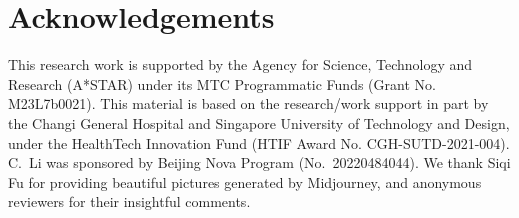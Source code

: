 \section*{Acknowledgements}

This research work is supported by the Agency for Science, Technology and Research (A*STAR) under its MTC Programmatic Funds (Grant No. M23L7b0021). 
This material is based on the research/work support in part by the Changi General Hospital and Singapore University of Technology and Design, under the HealthTech Innovation Fund (HTIF Award No. CGH-SUTD-2021-004). 
C.\ Li was sponsored by Beijing Nova Program (No.\ 20220484044).
We thank Siqi Fu for providing beautiful pictures generated by Midjourney, 
and anonymous reviewers for their insightful comments.

\clearpage

